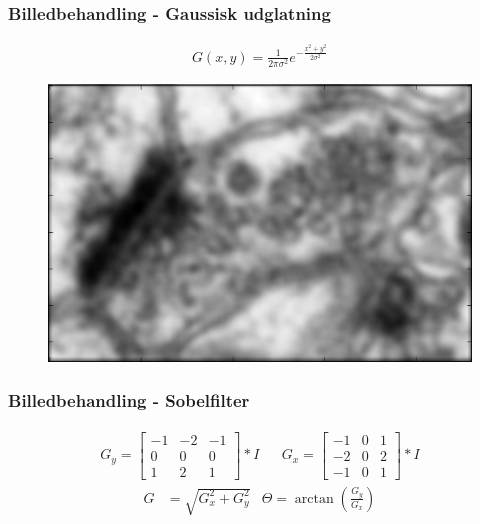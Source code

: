 \documentclass[12pt,t]{beamer}
\begin{document}
% 

\begin{frame}
\frametitle{Billedbehandling - Gaussisk udglatning}
\begin{align*}
	G(x,y) = \frac{1}{2\pi\sigma^2}e^{-\frac{x^2+y^2}{2\sigma^2}}\label{ali:premethod_gaussG}
\end{align*}

\begin{figure}[H]
	\centering
	\includegraphics[scale=0.5]{../files/premethod/img/gausscell.png}
\end{figure}
\end{frame}

\begin{frame}
\frametitle{Billedbehandling - Sobelfilter}
\begin{align*}
	G_y = \begin{bmatrix}
		-1 & -2 & -1\\
		0 & 0 & 0\\
		1 & 2 & 1
	\end{bmatrix} * I
	&&
	G_x = \begin{bmatrix}
		-1 & 0 & 1\\
		-2 & 0 & 2\\
		-1 & 0 & 1
	\end{bmatrix} * I
	\end{align*}
\begin{align*}
	G &= \sqrt{G_x^2 + G_y^2}
	&\Theta = \arctan\left(\frac{G_y}{G_x}\right)
\end{align*}
\end{frame}
\end{document}

